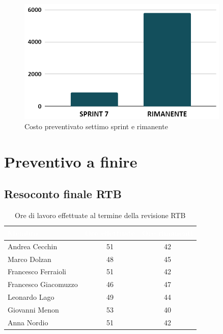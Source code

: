 \begin{figure}[h!]
    \centering
    \includegraphics[width=0.9\textwidth]{prev7costo.png}
    \caption{Costo preventivato settimo sprint e rimanente}
    \label{fig:preventivocostosettimosprint}
\end{figure}



\section{Preventivo a finire}
\subsection{Resoconto finale RTB}
\setlength{\tabcolsep}{10pt}
\renewcommand{\arraystretch}{1.5}
\begin{table}[h!]
    \centering
    \begin{tabularx}{\textwidth}{| X | c | c |}
        \hline
        \rowcolor{headerrow} \textbf{\textcolor{white}{Membro}} & \textbf{\textcolor{white}{Ore effettuate}} & \textbf{\textcolor{white}{Ore rimanenti}} \\
        \hline
        Andrea Cecchin & 51 & 42 \\
        \hline
        Marco Dolzan & 48 & 45 \\
        \hline
        Francesco Ferraioli & 51 & 42 \\
        \hline  
        Francesco Giacomuzzo & 46 & 47 \\
        \hline
        Leonardo Lago & 49 & 44\\
        \hline
        Giovanni Menon & 53 & 40\\
        \hline
        Anna Nordio & 51 & 42\\
        \hline
    \end{tabularx} 
    \caption{Ore di lavoro effettuate al termine della revisione RTB}
    \label{tab:orefatte}
\end{table}

